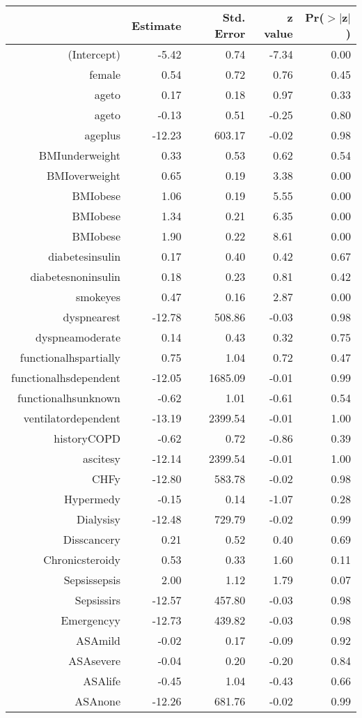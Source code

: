 \bigskip\bigskip
\centering
\begin{tabular}{rrrrr}
  \hline
 & Estimate & Std. Error & z value & Pr($>$$|$z$|$) \\ 
  \hline
(Intercept) & -5.42 & 0.74 & -7.34 & 0.00 \\ 
  female & 0.54 & 0.72 & 0.76 & 0.45 \\ 
  age\-65\-to\-74 & 0.17 & 0.18 & 0.97 & 0.33 \\ 
  age\-75\-to\-84 & -0.13 & 0.51 & -0.25 & 0.80 \\ 
  age\-85\-plus & -12.23 & 603.17 & -0.02 & 0.98 \\ 
  BMI\-underweight & 0.33 & 0.53 & 0.62 & 0.54 \\ 
  BMI\-overweight & 0.65 & 0.19 & 3.38 & 0.00 \\ 
  BMI\-obese\-1 & 1.06 & 0.19 & 5.55 & 0.00 \\ 
  BMI\-obese\-2 & 1.34 & 0.21 & 6.35 & 0.00 \\ 
  BMI\-obese\-3 & 1.90 & 0.22 & 8.61 & 0.00 \\ 
  diabetes\-insulin & 0.17 & 0.40 & 0.42 & 0.67 \\ 
  diabetes\-noninsulin & 0.18 & 0.23 & 0.81 & 0.42 \\ 
  smoke\-yes & 0.47 & 0.16 & 2.87 & 0.00 \\ 
  dyspnea\-rest & -12.78 & 508.86 & -0.03 & 0.98 \\ 
  dyspnea\-moderate & 0.14 & 0.43 & 0.32 & 0.75 \\ 
  functional\-hs\-partially & 0.75 & 1.04 & 0.72 & 0.47 \\ 
  functional\-hs\-dependent & -12.05 & 1685.09 & -0.01 & 0.99 \\ 
  functional\-hs\-unknown & -0.62 & 1.01 & -0.61 & 0.54 \\ 
  ventilator\-dependent & -13.19 & 2399.54 & -0.01 & 1.00 \\ 
  history\-COPD & -0.62 & 0.72 & -0.86 & 0.39 \\ 
  ascites\-y & -12.14 & 2399.54 & -0.01 & 1.00 \\ 
  CHF\-y & -12.80 & 583.78 & -0.02 & 0.98 \\ 
  Hyper\-med\-y & -0.15 & 0.14 & -1.07 & 0.28 \\ 
  Dialysis\-y & -12.48 & 729.79 & -0.02 & 0.99 \\ 
  Diss\-cancer\-y & 0.21 & 0.52 & 0.40 & 0.69 \\ 
  Chronic\-steroid\-y & 0.53 & 0.33 & 1.60 & 0.11 \\ 
  Sepsis\-sepsis & 2.00 & 1.12 & 1.79 & 0.07 \\ 
  Sepsis\-sirs & -12.57 & 457.80 & -0.03 & 0.98 \\ 
  Emergency\-y & -12.73 & 439.82 & -0.03 & 0.98 \\ 
  ASA\-mild & -0.02 & 0.17 & -0.09 & 0.92 \\ 
  ASA\-severe & -0.04 & 0.20 & -0.20 & 0.84 \\ 
  ASA\-life & -0.45 & 1.04 & -0.43 & 0.66 \\ 
  ASA\-none & -12.26 & 681.76 & -0.02 & 0.99 \\ 
   \hline
\end{tabular}
